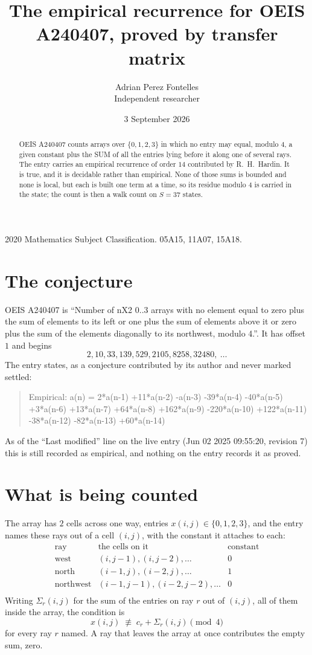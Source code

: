 \documentclass[11pt,a4paper]{article}
\title{The empirical recurrence for OEIS A240407, proved by transfer matrix}
\author{Adrian Perez Fontelles\\ \small Independent researcher}
\date{3 September 2026}
\theoremstyle{plain}
\theoremstyle{definition}
\begin{document}
\maketitle

\begin{abstract}
OEIS A240407 counts arrays over $\{0,1,2,3\}$ in which no entry may equal, modulo $4$, a given
constant plus the SUM of all the entries lying before it along one of several rays. The entry
carries an empirical recurrence of order $14$ contributed by R.~H.~Hardin. It is true, and
it is decidable rather than empirical. None of those sums is bounded and none is local, but
each is built one term at a time, so its residue modulo $4$ is carried in the state; the
count is then a walk count on $S=37$ states.
\end{abstract}

\noindent\small 2020 Mathematics Subject Classification. 05A15, 11A07, 15A18.\normalsize

\section{The conjecture}

OEIS A240407 is ``Number of nX2 0..3 arrays with no element equal to zero plus the sum of elements to its left or one plus the sum of elements above it or zero plus the sum of the elements diagonally to its northwest, modulo 4.''. It has offset $1$ and begins
\[
2, 10, 33, 139, 529, 2105, 8258, 32480,\ \dots
\]
The entry states, as a conjecture contributed by its author and never marked settled:
\begin{quote}
Empirical: a(n) = 2*a(n-1) +11*a(n-2) -a(n-3) -39*a(n-4) -40*a(n-5) +3*a(n-6) +13*a(n-7) +64*a(n-8) +162*a(n-9) -220*a(n-10) +122*a(n-11) -38*a(n-12) -82*a(n-13) +60*a(n-14)
\end{quote}
As of the ``Last modified'' line on the live entry (Jun 02 2025 09:55:20, revision 7) this is still
recorded as empirical, and nothing on the entry records it as proved.

\section{What is being counted}

The array has $2$ cells across one way, entries $x(i,j)\in\{0,1,2,3\}$, and the entry names these
rays out of a cell $(i,j)$, with the constant it attaches to each:
\[
\begin{array}{lll}
\text{ray} & \text{the cells on it} & \text{constant} \\[2pt]
\text{west} & (i,j-1),(i,j-2),\dots & 0 \\
\text{north} & (i-1,j),(i-2,j),\dots & 1 \\
\text{northwest} & (i-1,j-1),(i-2,j-2),\dots & 0 \\
\end{array}
\]
Writing $\Sigma_r(i,j)$ for the sum of the entries on ray $r$ out of $(i,j)$, all of them
inside the array, the condition is
\[
x(i,j)\;\not\equiv\;c_r+\Sigma_r(i,j) \pmod{4}
\]
for every ray $r$ named. A ray that leaves the array at once contributes the empty sum,
zero.
\end{document}
